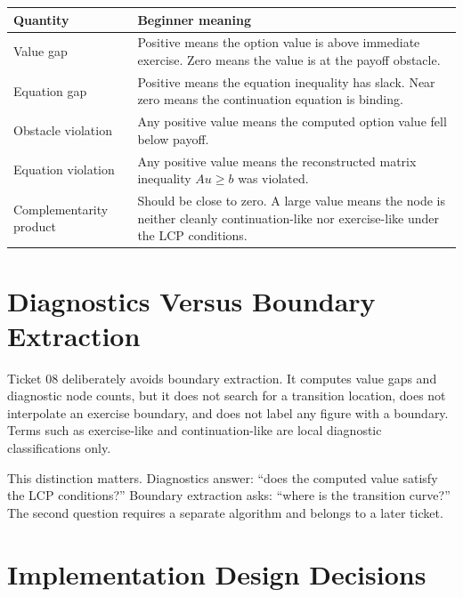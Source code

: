 \documentclass[11pt,a4paper]{article}
\begin{document}
\begin{longtable}{L{0.28\textwidth}L{0.60\textwidth}}
\toprule
Quantity & Beginner meaning \\
\midrule
\endhead
Value gap & Positive means the option value is above immediate exercise. Zero means the value is
at the payoff obstacle. \\
Equation gap & Positive means the equation inequality has slack. Near zero means the continuation
equation is binding. \\
Obstacle violation & Any positive value means the computed option value fell below payoff. \\
Equation violation & Any positive value means the reconstructed matrix inequality \(Au\geq b\)
was violated. \\
Complementarity product & Should be close to zero. A large value means the node is neither cleanly
continuation-like nor exercise-like under the LCP conditions. \\
\bottomrule
\end{longtable}

\section{Diagnostics Versus Boundary Extraction}

Ticket 08 deliberately avoids boundary extraction. It computes value gaps and diagnostic node
counts, but it does not search for a transition location, does not interpolate an exercise
boundary, and does not label any figure with a boundary. Terms such as exercise-like and
continuation-like are local diagnostic classifications only.

This distinction matters. Diagnostics answer: ``does the computed value satisfy the LCP
conditions?'' Boundary extraction asks: ``where is the transition curve?'' The second question
requires a separate algorithm and belongs to a later ticket.

\section{Implementation Design Decisions}
\end{document}
